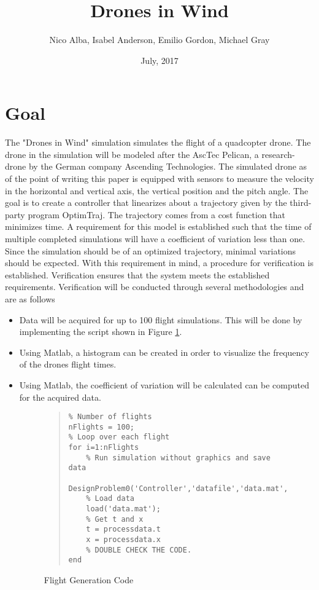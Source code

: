 \documentclass[12pt]{article}
\title{Drones in Wind}
\author{Nico Alba, Isabel Anderson, Emilio Gordon, Michael Gray}
\date{July, 2017}
\begin{document}
\maketitle


\section{Goal}
The "Drones in Wind" simulation simulates the flight of a quadcopter drone. The drone in the simulation will be modeled after the AscTec Pelican, a research-drone by the German company Ascending Technologies. The simulated drone as of the point of writing this paper is equipped with sensors to measure the velocity in the horizontal and vertical axis, the vertical position and the pitch angle. 
\newline \newline
The goal is to create a controller that linearizes about a trajectory given by the third-party program OptimTraj. The trajectory comes from a cost function that minimizes time. A requirement for this model is established such that the time of multiple completed simulations will have a coefficient of variation less than one. Since the simulation should be of an optimized trajectory, minimal variations should be expected. With this requirement in mind, a procedure for verification is established. Verification ensures that the system meets the established requirements. Verification will be conducted through several methodologies and are as follows
\begin{itemize}
\item Data will be acquired for up to 100 flight simulations. This will be done by implementing the script shown in Figure \ref{fig:fgc}.
\item Using Matlab, a histogram can be created in order to visualize the frequency of the drones flight times. 
\item Using Matlab, the coefficient of variation will be calculated can be computed for the acquired data.
\begin{figure}[H]
\begin{quote}
\begin{lstlisting}
% Number of flights
nFlights = 100;
% Loop over each flight
for i=1:nFlights
    % Run simulation without graphics and save data
    DesignProblem0('Controller','datafile','data.mat','display',false);
    % Load data
    load('data.mat');
    % Get t and x
    t = processdata.t
    x = processdata.x
    % DOUBLE CHECK THE CODE.
end
\end{lstlisting}
\end{quote}
\caption{Flight Generation Code\label{fig:fgc}}
\end{figure}
\end{itemize}
\end{document}
